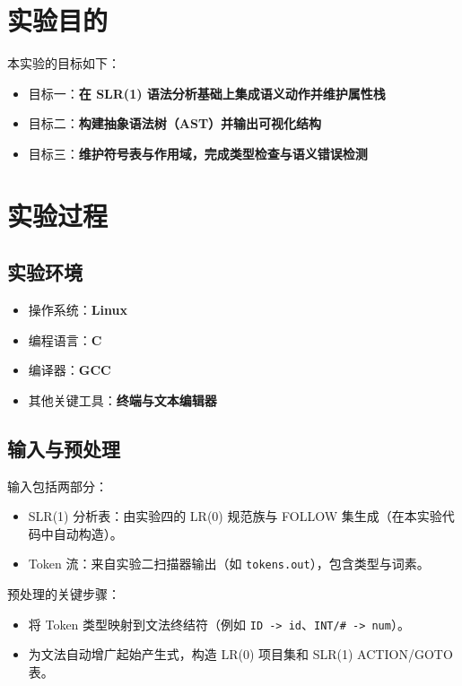 \documentclass[12pt,a4paper]{ctexart}
\title{\reporttitle}
\author{\authname：\underline{李祥熙} \quad \authid：\underline{2234412799}}
\date{\today}
\begin{document}
\maketitle
\tableofcontents
\newpage

\section{实验目的}
本实验的目标如下：
\begin{itemize}
	\item 目标一：\textbf{在 SLR(1) 语法分析基础上集成语义动作并维护属性栈}
	\item 目标二：\textbf{构建抽象语法树（AST）并输出可视化结构}
	\item 目标三：\textbf{维护符号表与作用域，完成类型检查与语义错误检测}
\end{itemize}

\section{实验过程}
\subsection{实验环境}
\begin{itemize}
	\item 操作系统：\textbf{Linux}
	\item 编程语言：\textbf{C}
	\item 编译器：\textbf{GCC}
	\item 其他关键工具：\textbf{终端与文本编辑器}
\end{itemize}

\subsection{输入与预处理}
输入包括两部分：
\begin{itemize}
	\item SLR(1) 分析表：由实验四的 LR(0) 规范族与 FOLLOW 集生成（在本实验代码中自动构造）。
	\item Token 流：来自实验二扫描器输出（如 \texttt{tokens.out}），包含类型与词素。
\end{itemize}
预处理的关键步骤：
\begin{itemize}
	\item 将 Token 类型映射到文法终结符（例如 \texttt{ID -> id}、\texttt{INT/\# -> num}）。
	\item 为文法自动增广起始产生式，构造 LR(0) 项目集和 SLR(1) ACTION/GOTO 表。
\end{itemize}
\end{document}
